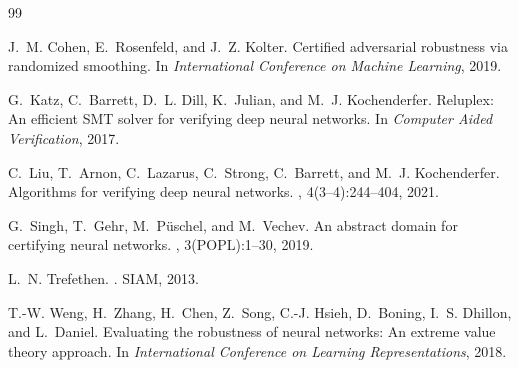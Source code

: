 \documentclass{article}
\theoremstyle{definition}
\begin{document}
\begin{thebibliography}{99}

J.~M. Cohen, E.~Rosenfeld, and J.~Z. Kolter.
\newblock Certified adversarial robustness via randomized smoothing.
\newblock In {\em International Conference on Machine Learning}, 2019.

G.~Katz, C.~Barrett, D.~L. Dill, K.~Julian, and M.~J. Kochenderfer.
\newblock Reluplex: An efficient {SMT} solver for verifying deep neural
  networks.
\newblock In {\em Computer Aided Verification}, 2017.

C.~Liu, T.~Arnon, C.~Lazarus, C.~Strong, C.~Barrett, and M.~J. Kochenderfer.
\newblock Algorithms for verifying deep neural networks.
, 4(3--4):244--404, 2021.

G.~Singh, T.~Gehr, M.~P\"uschel, and M.~Vechev.
\newblock An abstract domain for certifying neural networks.
, 3(POPL):1--30,
  2019.

L.~N. Trefethen.
.
\newblock SIAM, 2013.

T.-W. Weng, H.~Zhang, H.~Chen, Z.~Song, C.-J. Hsieh, D.~Boning,
  I.~S. Dhillon, and L.~Daniel.
\newblock Evaluating the robustness of neural networks: An extreme value theory
  approach.
\newblock In {\em International Conference on Learning Representations}, 2018.

\end{thebibliography}
\end{document}
